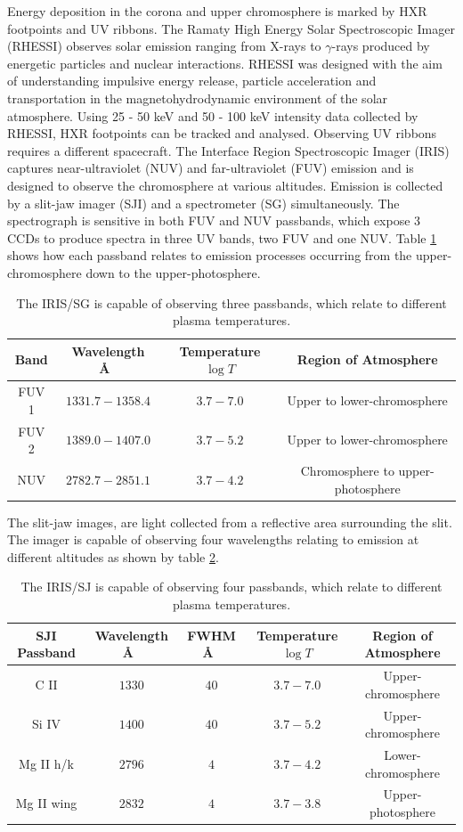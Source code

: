 Energy deposition in the corona and upper chromosphere is marked by HXR footpoints and UV ribbons. The Ramaty High Energy Solar Spectroscopic Imager (RHESSI) observes solar emission ranging from X-rays to $\gamma$-rays produced by energetic particles and nuclear interactions. RHESSI was designed with the aim of understanding impulsive energy release, particle acceleration and transportation in the magnetohydrodynamic environment of the solar atmosphere. Using 25 - 50 keV and 50 - 100 keV intensity data collected by RHESSI, HXR footpoints can be tracked and analysed. Observing UV ribbons requires a different spacecraft. The Interface Region Spectroscopic Imager (IRIS) captures near-ultraviolet (NUV) and far-ultraviolet (FUV) emission and is designed to observe the chromosphere at various altitudes. Emission is collected by a slit-jaw imager (SJI) and a spectrometer (SG) simultaneously. The spectrograph is sensitive in both FUV and NUV passbands, which expose 3 CCDs to produce spectra in three UV bands, two FUV and one NUV. Table \ref{iris-sg} shows how each passband relates to emission processes occurring from the upper-chromosphere down to the upper-photosphere. 

\begin{table}
\centering
\begin{tabular}{|c|c|c|c|}
Band & Wavelength \AA\ & Temperature $\log{T}$ & Region of Atmosphere\\ 
\hline
FUV 1 & $1331.7 - 1358.4$ & $3.7 - 7.0$ & Upper to lower-chromosphere\\ 
FUV 2 & $1389.0 - 1407.0$ & $3.7 - 5.2$ & Upper to lower-chromosphere\\ 
NUV & $2782.7 - 2851.1$ & $3.7 - 4.2$ & Chromosphere to upper-photosphere\\ 
\end{tabular}
\caption{The IRIS/SG is capable of observing three passbands, which relate to different plasma temperatures.}\label{iris-sg}
\end{table}

The slit-jaw images, are light collected from a reflective area surrounding the slit. The imager is capable of observing four wavelengths relating to emission at different altitudes as shown by table \ref{iris-sj}. 

\begin{table}
\centering
\begin{tabular}{|c|c|c|c|c|}
SJI Passband & Wavelength \AA\ & FWHM \AA\ & Temperature $\log{T}$ & Region of Atmosphere\\ 
\hline
C II  & $1330$ & $40$ & $3.7 - 7.0$ & Upper-chromosphere\\ 
Si IV  & $1400$ & $40$ & $3.7 - 5.2$ & Upper-chromosphere\\ 
Mg II h/k & $2796$ & $4$ & $3.7 - 4.2$ & Lower-chromosphere\\ 
Mg II wing & $2832$ & $4$ & $3.7 - 3.8$ & Upper-photosphere\\   
\end{tabular}
\caption{The IRIS/SJ is capable of observing four passbands, which relate to different plasma temperatures.}\label{iris-sj}
\end{table}  

